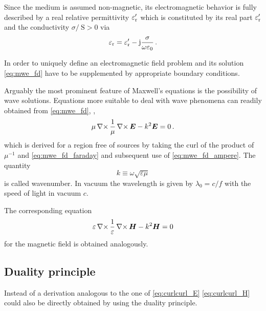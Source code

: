 Since the medium is assumed non-magnetic, its electromagnetic behavior is fully
described by a real relative permittivity $\varepsilon_{\mathrm{r}}^\prime$ which is constituted
by its real part $\varepsilon_{\mathrm{r}}^\prime$ and the conductivity
$\sigma / \SI{}{\siemens} > 0$ via
\begin{equation}
	\varepsilon_{\mathrm{r}} = \varepsilon_{\mathrm{r}}^\prime - \mathrm{j} \frac{\sigma}{\omega \varepsilon_0} \,.
\end{equation}

In order to uniquely define an electromagnetic field problem and its solution
\eqref{eq:mwe_fd} have to be supplemented by appropriate boundary conditions.

Arguably the most prominent feature of Maxwell's equations is the possibility
of wave solutions. Equations more suitable to deal with wave phenomena can
readily obtained from \eqref{eq:mwe_fd}, \eg,
\begin{equation}\label{eq:curlcurl_E}
	\mu\curl\frac{1}{\mu}\curl\pvec{E} - k^2\pvec{E} = 0 \,.
\end{equation}
which is derived for a region free of sources by taking the curl of the product
of $\mu^{-1}$ and \eqref{eq:mwe_fd_faraday} and subsequent use of
\eqref{eq:mwe_fd_ampere}. The quantity
\begin{equation}\label{eq:wavenumber}
	k \equiv \omega \sqrt{\varepsilon\mu}
\end{equation}
is called wavenumber. In vacuum the wavelength is given by $\lambda_0 = c / f$
with the speed of light in vacuum $c$.

The corresponding equation
\begin{equation}\label{eq:curlcurl_H}
	\varepsilon\curl\frac{1}{\varepsilon}\curl\pvec{H} - k^2\pvec{H} = 0
\end{equation}
for the magnetic field is obtained analogously.

\subsection{Duality principle}
\label{subsec:duality_principle}

Instead of a derivation analogous to the one of \eqref{eq:curlcurl_E}
\eqref{eq:curlcurl_H} could also be directly obtained by using the duality
principle.


